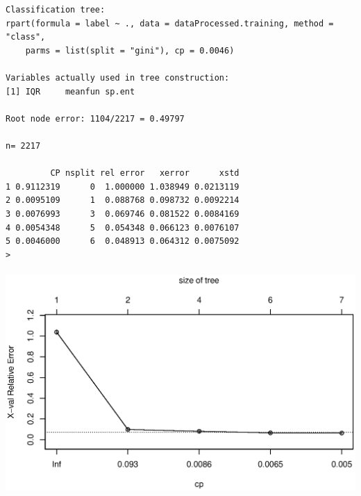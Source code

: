 \documentclass{article}%
\begin{document}
\begin{verbatim}
Classification tree:
rpart(formula = label ~ ., data = dataProcessed.training, method = "class",
    parms = list(split = "gini"), cp = 0.0046)

Variables actually used in tree construction:
[1] IQR     meanfun sp.ent

Root node error: 1104/2217 = 0.49797

n= 2217

         CP nsplit rel error   xerror      xstd
1 0.9112319      0  1.000000 1.038949 0.0213119
2 0.0095109      1  0.088768 0.098732 0.0092214
3 0.0076993      3  0.069746 0.081522 0.0084169
4 0.0054348      5  0.054348 0.066123 0.0076107
5 0.0046000      6  0.048913 0.064312 0.0075092
> \end{verbatim}
\includegraphics[width = \textwidth, height = 8.5cm]{Rplot_tree.eps}
\end{document}
